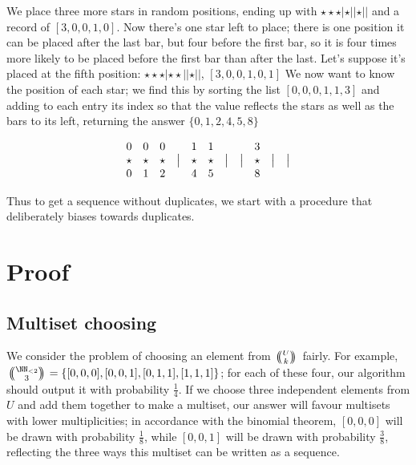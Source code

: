 \documentclass[letterpaper,luatex,11pt]{article}
\newcommand{\multichoose}[2]{
\left.\mathchoice
  {\left(\kern-0.48em\binom{#1}{#2}\kern-0.48em\right)}
  {\big(\kern-0.30em\binom{\smash{#1}}{\smash{#2}}\kern-0.30em\big)}
  {\left(\kern-0.30em\binom{\smash{#1}}{\smash{#2}}\kern-0.30em\right)}
  {\left(\kern-0.30em\binom{\smash{#1}}{\smash{#2}}\kern-0.30em\right)}
\right.}
\begin{document}
We place three more stars in random positions, ending up with \(\star\star\star|\star||\star||\)
and a record of \([3, 0, 0, 1, 0]\). Now there's one star left to place; there is one
position it can be placed after the last bar, but four before the first bar, so it is four times
more likely to be placed before the first bar than after the last. Let's suppose it's placed
at the fifth position: \(\star\star\star|\star\star||\star||\), \([3, 0, 0, 1, 0, 1]\) We now
want to know the position of each star; we find this by sorting the list \([0, 0, 0, 1, 1, 3]\)
and adding to each entry its index so that the value reflects the stars as well as the bars to its
left, returning the answer $\{0, 1, 2, 4, 5, 8\}$

\begin{displaymath}
\begin{array}{ c c c c c c c c c c c }
    0 & 0 & 0 & & 1 & 1 & & & 3 & & \\
    \star & \star & \star & \big| & \star & \star & \big| & \big| & \star & \big| & \big| \\
    0 & 1 & 2 & & 4 & 5 & & & 8 & & \\
\end{array}
\end{displaymath}

Thus to get a sequence without duplicates, we start with a procedure that deliberately
biases towards duplicates.

\section{Proof}

\subsection{Multiset choosing}

We consider the problem of choosing an element from $\multichoose{U}{k}$ fairly.
For example, $\multichoose{\NN_{<2}}{3} = \{[0, 0, 0], [0, 0, 1], [0, 1, 1], [1, 1, 1]\}$; 
for each of these four, our algorithm should output it with probability $\frac{1}{4}$.
If we choose three independent elements from $U$ and add them together to make a multiset,
our answer will favour multisets with lower multiplicities; in accordance
with the binomial theorem, $[0, 0, 0]$ will be drawn with probability $\frac{1}{8}$, while
$[0, 0, 1]$ will be drawn with probability $\frac{3}{8}$, reflecting the three ways this multiset
can be written as a sequence.
\end{document}
